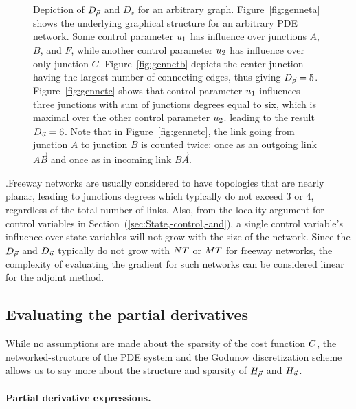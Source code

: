 \begin{figure}
\begin{centering}
{		}
		\par\end{centering}
				
		\caption{Depiction of $D_{\vec{\rho}}$ and $D_{v}$ for an arbitrary graph. Figure~\ref{fig:genneta}
			shows the underlying graphical structure for an arbitrary PDE network.
			Some control parameter $u_{1}$ has influence over junctions
			$A$, $B$, and $F$, while another control parameter $u_{2}$
			has influence over only junction $C$. Figure~\ref{fig:gennetb}
			depicts the center junction having the largest number of connecting
			edges, thus giving $D_{\vec{\rho}}=5$. Figure~\ref{fig:gennetc} shows
			that control parameter $u_{1}$ influences three junctions with
			sum of junctions degrees equal to six, which is maximal over the other
			control parameter $u_{2}$. leading to the result $D_{\vec{u}}=6$.
			Note that in Figure~\ref{fig:gennetc}, the link going from junction
			$A$ to junction $B$ is counted twice: once as an outgoing link $\vec{AB}$
			and once as in incoming link $\vec{BA}$.\label{fig:Depicting--and}}
		\end{figure}
		.Freeway networks are usually considered to have topologies that are
		nearly planar, leading to junctions degrees which typically do not
		exceed 3 or 4, regardless of the total number of links. Also, from
		the locality argument for control variables in Section~(\ref{sec:State,-control,-and}),
		a single control variable's influence over state variables will not
		grow with the size of the network. Since the $D_{\vec{\rho}}$ and
		$D_{\vec{u}}$ typically do not grow with $NT$ or
		$MT$ for freeway networks, the complexity of evaluating
		the gradient for such networks can be considered linear for the adjoint
		method.
				
				
		\subsection{Evaluating the partial derivatives\label{sub:Evaluating--and}}
				
		While no assumptions are made about the sparsity of the cost function
		$C$, the networked-structure of the PDE system and the Godunov
		discretization scheme allows us to say more about the structure and
		sparsity of $H_{\vec{\rho}}$ and $H_{\vec{u}}$.
				
				
		\paragraph{Partial derivative expressions.}
				
